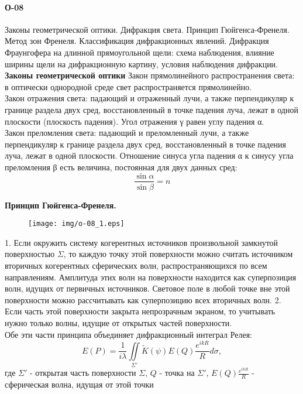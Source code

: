 


\paragraph{О-08}
Законы геометрической оптики. Дифракция света. Принцип Гюйгенса-Френеля. Метод зон Френеля. Классификация дифракционных явлений. Дифракция Фраунгофера на длинной прямоугольной щели: схема наблюдения, влияние ширины щели на дифракционную картину, условия наблюдения дифракции.\\

\textbf{Законы геометрической оптики}
Закон прямолинейного распространения света: в оптически однородной среде свет распространяется прямолинейно.\\
Закон отражения света: падающий и отраженный лучи, а также перпендикуляр к границе раздела двух сред, восстановленный в точке падения луча, лежат в одной плоскости (плоскость падения). Угол отражения γ равен углу падения α.\\
Закон преломления света: падающий и преломленный лучи, а также перпендикуляр к границе раздела двух сред, восстановленный в точке падения луча, лежат в одной плоскости. Отношение синуса угла падения α к синусу угла преломления β есть величина, постоянная для двух данных сред: 
$$\frac{\sin \alpha}{\sin \beta} = n$$

\textbf{Принцип Гюйгенса-Френеля. }\\

\begin{figure}[h]
\begin{center}
\texttt{[image: img/o-08\_1.eps]}
\end{center}
\end{figure}

1. Если окружить систему когерентных источников произвольной замкнутой поверхностью $\Sigma$, то каждую точку этой поверхности можно считать источником вторичных когерентных сферических волн, распространяющихся по всем направлениям. Амплитуда этих волн на поверхности находится как суперпозиция волн, идущих от первичных источников. Световое поле в любой точке вне этой поверхности можно рассчитывать как суперпозицию всех вторичных волн. 
2. Если часть этой поверхности закрыта непрозрачным экраном, то учитывать нужно только волны, идущие от открытых частей поверхности.\\

Обе эти части принципа объединяет дифракционный интеграл Релея:
$$E(P) = \frac{1}{i\lambda}\iint\limits_{\Sigma'} \widetilde K(\psi) E(Q)\frac{e^{ikR}}{R}d\sigma,$$
где $\Sigma'$ - открытая часть поверхности $\Sigma$, $Q$ - точка на $\Sigma'$, $E(Q)\frac{e^{ikR}}{R}$ - сферическая волна, идущая от этой точки 



